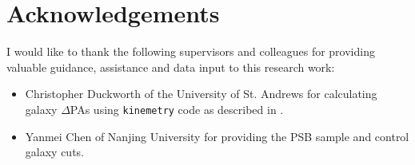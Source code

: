 \section*{Acknowledgements} %

I would like to thank the following supervisors and colleagues for providing valuable guidance, assistance and data input to this research work:
\begin{itemize}
    \item Christopher Duckworth of the University of St. Andrews for calculating galaxy $\Delta$PAs using \texttt{kinemetry} code as described in \citet{2011MNRAS.414.2923K}.
    \item Yanmei Chen of Nanjing University for providing the PSB sample and control galaxy cuts.
\end{itemize}
